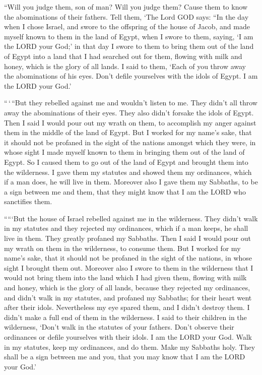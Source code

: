  ``Will you judge them, son of man? Will you judge them?
Cause them to know the abominations of their fathers.  Tell
them, `The Lord GOD says: ``In the day when I chose Israel, and swore to
the offspring of the house of Jacob, and made myself known to them in
the land of Egypt, when I swore to them, saying, `I am the LORD your
God;'  in that day I swore to them to bring them out of the
land of Egypt into a land that I had searched out for them, flowing with
milk and honey, which is the glory of all lands.  I said to
them, `Each of you throw away the abominations of his eyes. Don't defile
yourselves with the idols of Egypt. I am the LORD your God.'

 ``\,`\,``But they rebelled against me and wouldn't listen
to me. They didn't all throw away the abominations of their eyes. They
also didn't forsake the idols of Egypt. Then I said I would pour out my
wrath on them, to accomplish my anger against them in the middle of the
land of Egypt.  But I worked for my name's sake, that it
should not be profaned in the sight of the nations amongst which they
were, in whose sight I made myself known to them in bringing them out of
the land of Egypt.  So I caused them to go out of the land
of Egypt and brought them into the wilderness.  I gave them
my statutes and showed them my ordinances, which if a man does, he will
live in them.  Moreover also I gave them my Sabbaths, to be
a sign between me and them, that they might know that I am the LORD who
sanctifies them.

 `````But the house of Israel rebelled against me in the
wilderness. They didn't walk in my statutes and they rejected my
ordinances, which if a man keeps, he shall live in them. They greatly
profaned my Sabbaths. Then I said I would pour out my wrath on them in
the wilderness, to consume them.  But I worked for my
name's sake, that it should not be profaned in the sight of the nations,
in whose sight I brought them out.  Moreover also I swore
to them in the wilderness that I would not bring them into the land
which I had given them, flowing with milk and honey, which is the glory
of all lands,  because they rejected my ordinances, and
didn't walk in my statutes, and profaned my Sabbaths; for their heart
went after their idols.  Nevertheless my eye spared them,
and I didn't destroy them. I didn't make a full end of them in the
wilderness.  I said to their children in the wilderness,
`Don't walk in the statutes of your fathers. Don't observe their
ordinances or defile yourselves with their idols.  I am the
LORD your God. Walk in my statutes, keep my ordinances, and do them.
 Make my Sabbaths holy. They shall be a sign between me and
you, that you may know that I am the LORD your God.'

